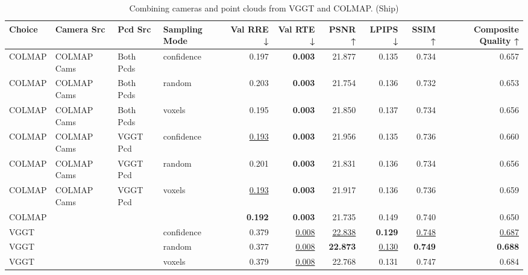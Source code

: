 \begin{table}[H]
\caption{Combining cameras and point clouds from VGGT and COLMAP. (Ship)}
\label{tab:07_combined_single_ship}
\centering
\scriptsize
\begin{tabular}{llllrrrrrr}
\toprule
Choice & Camera Src & Pcd Src & Sampling Mode & Val RRE ↓ & Val RTE ↓ & PSNR ↑ & LPIPS ↓ & SSIM ↑ & Composite Quality ↑ \\
\midrule
COLMAP & COLMAP Cams & Both Pcds & confidence & 0.197 & \textbf{0.003} & 21.877 & 0.135 & 0.734 & 0.657 \\
COLMAP & COLMAP Cams & Both Pcds & random & 0.203 & \textbf{0.003} & 21.754 & 0.136 & 0.732 & 0.653 \\
COLMAP & COLMAP Cams & Both Pcds & voxels & 0.195 & \textbf{0.003} & 21.850 & 0.137 & 0.734 & 0.656 \\
COLMAP & COLMAP Cams & VGGT Pcd & confidence & \underline{0.193} & \textbf{0.003} & 21.956 & 0.135 & 0.736 & 0.660 \\
COLMAP & COLMAP Cams & VGGT Pcd & random & 0.201 & \textbf{0.003} & 21.831 & 0.136 & 0.734 & 0.656 \\
COLMAP & COLMAP Cams & VGGT Pcd & voxels & \underline{0.193} & \textbf{0.003} & 21.917 & 0.136 & 0.736 & 0.659 \\
COLMAP &  &  &  & \textbf{0.192} & \textbf{0.003} & 21.735 & 0.149 & 0.740 & 0.650 \\
VGGT &  &  & confidence & 0.379 & \underline{0.008} & \underline{22.838} & \textbf{0.129} & \underline{0.748} & \underline{0.687} \\
VGGT &  &  & random & 0.377 & \underline{0.008} & \textbf{22.873} & \underline{0.130} & \textbf{0.749} & \textbf{0.688} \\
VGGT &  &  & voxels & 0.379 & \underline{0.008} & 22.768 & 0.131 & 0.747 & 0.684 \\
\bottomrule
\end{tabular}
\end{table}